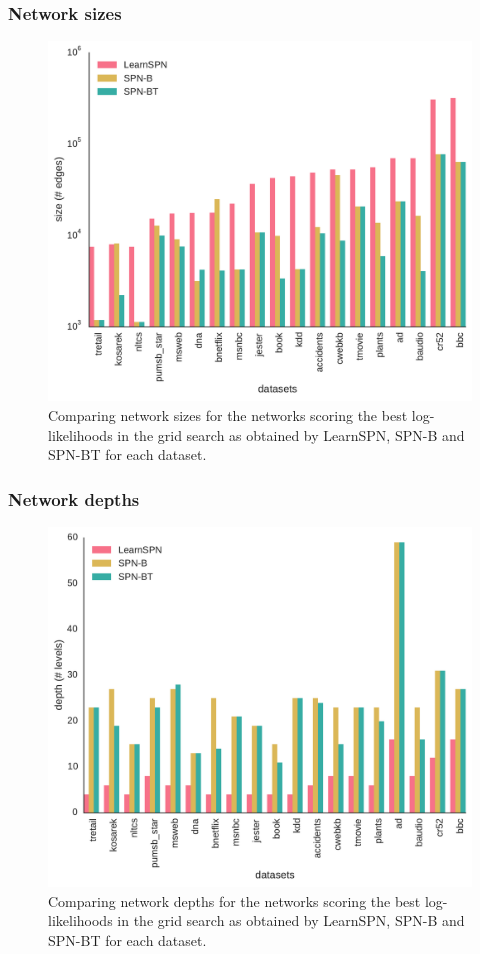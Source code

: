 \documentclass[xcolor={usenames,dvipsnames,svgnames}, compress]{beamer}
\begin{document}
  \begin{frame}
    \frametitle{Network sizes}

    \begin{figure}[htbp]
      \begin{center}
        \includegraphics[width=0.65\linewidth]{figures/edges-comp.pdf}
        \caption{Comparing network sizes
          for the networks scoring the best log-likelihoods in the grid
          search as obtained by \textsf{LearnSPN}, \textsf{SPN-B} and
          \textsf{SPN-BT} for each dataset.}
      \end{center}
    \end{figure}
  \end{frame}

  \begin{frame}
    \frametitle{Network depths}

    \begin{figure}[htbp]
      \begin{center}
        \includegraphics[width=0.65\linewidth]{figures/levels-comp.pdf}
        \caption{Comparing network depths
          for the networks scoring the best log-likelihoods in the grid
          search as obtained by \textsf{LearnSPN}, \textsf{SPN-B} and
          \textsf{SPN-BT} for each dataset.}
      \end{center}
    \end{figure}
  \end{frame}
\end{document}
